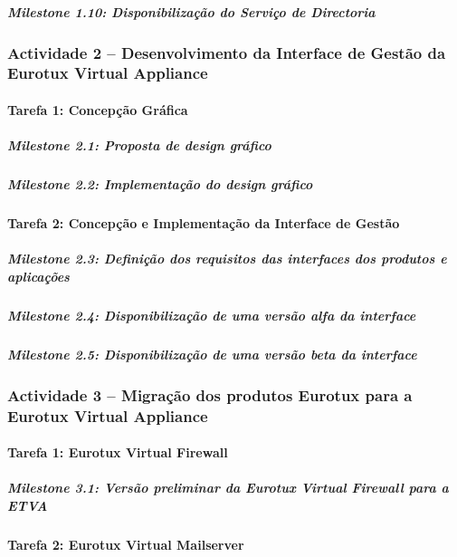 \documentclass[a4paper,12pt,portugues]{article}
\begin{document}
\subparagraph{Milestone 1.10: Disponibilização do Serviço de Directoria} %


\subsubsection*{Actividade 2 – Desenvolvimento da Interface de Gestão da Eurotux Virtual Appliance} %


\paragraph{Tarefa 1: Concepção Gráfica} %

\subparagraph{Milestone 2.1: Proposta de design gráfico} %

\subparagraph{Milestone 2.2: Implementação do design gráfico} %


\paragraph{Tarefa 2: Concepção e Implementação da Interface de Gestão} %

\subparagraph{Milestone 2.3: Definição dos requisitos das interfaces dos produtos e aplicações} %

\subparagraph{Milestone 2.4: Disponibilização de uma versão alfa da interface} %


\subparagraph{Milestone 2.5: Disponibilização de uma versão beta da interface} %



\subsubsection*{Actividade 3 – Migração dos produtos Eurotux para a Eurotux Virtual Appliance} %


\paragraph{Tarefa 1: Eurotux Virtual Firewall} 

\subparagraph{Milestone 3.1: Versão preliminar da Eurotux Virtual Firewall para a ETVA}




\paragraph{Tarefa 2: Eurotux Virtual Mailserver}
\end{document}

